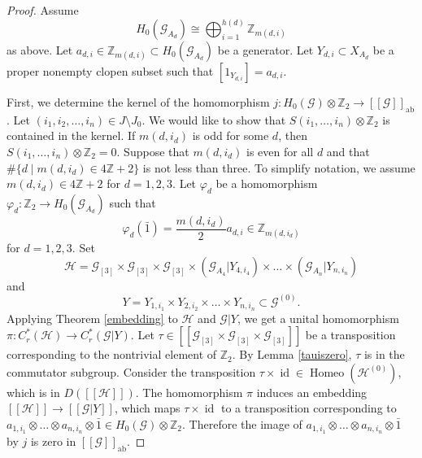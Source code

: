 \documentclass[11pt]{article}
\theoremstyle{definition}
\numberwithin{equation}{section}
\renewcommand{\phi}{\varphi}
\newcommand{\Homeo}{\operatorname{Homeo}}
\newcommand{\id}{\operatorname{id}}
\newcommand{\ab}{\mathrm{ab}}
\newcommand{\G}{\mathcal{G}}
\renewcommand{\H}{\mathcal{H}}
\newcommand{\Z}{\mathbb{Z}}
\begin{document}
\begin{proof}
Assume 
\[
H_0(\G_{A_d})\cong\bigoplus_{i=1}^{h(d)}\Z_{m(d,i)}
\]
as above. 
Let $a_{d,i}\in\Z_{m(d,i)}\subset H_0(\G_{A_d})$ be a generator. 
Let $Y_{d,i}\subset X_{A_d}$ be a proper nonempty clopen subset 
such that $[1_{Y_{d,i}}]=a_{d,i}$. 

First, we determine the kernel of 
the homomorphism $j:H_0(\G)\otimes\Z_2\to[[\G]]_\ab$. 
Let $(i_1,i_2,\dots,i_n)\in J\setminus J_0$. 
We would like to show that 
$S(i_1,\dots,i_n)\otimes\Z_2$ is contained in the kernel. 
If $m(d,i_d)$ is odd for some $d$, then $S(i_1,\dots,i_n)\otimes\Z_2=0$. 
Suppose that $m(d,i_d)$ is even for all $d$ and 
that $\#\{d\mid m(d,i_d)\in4\Z{+}2\}$ is not less than three. 
To simplify notation, we assume $m(d,i_d)\in4\Z{+}2$ for $d=1,2,3$. 
Let $\phi_d$ be a homomorphism $\phi_d:\Z_2\to H_0(\G_{A_d})$ such that 
\[
\phi_d(\bar{1})=\frac{m(d,i_d)}{2}a_{d,i}\in\Z_{m(d,i_d)}
\]
for $d=1,2,3$. 
Set 
\[
\H=\G_{[3]}\times\G_{[3]}\times\G_{[3]}
\times(\G_{A_4}|Y_{4,i_4})\times\dots\times(\G_{A_n}|Y_{n,i_n})
\]
and 
\[
Y=Y_{1,i_1}\times Y_{2,i_2}\times\dots\times Y_{n,i_n}\subset\G^{(0)}. 
\]
Applying Theorem \ref{embedding} to $\H$ and $\G|Y$, 
we get a unital homomorphism $\pi:C^*_r(\H)\to C^*_r(\G|Y)$. 
Let $\tau\in[[\G_{[3]}\times\G_{[3]}\times\G_{[3]}]]$ be a transposition 
corresponding to the nontrivial element of $\Z_2$. 
By Lemma \ref{tauiszero}, $\tau$ is in the commutator subgroup. 
Consider the transposition $\tau\times\id\in\Homeo(\H^{(0)})$, 
which is in $D([[\H]])$. 
The homomorphism $\pi$ induces an embedding $[[\H]]\to[[\G|Y]]$, 
which maps $\tau\times\id$ to a transposition corresponding to 
$a_{1,i_1}\otimes\dots\otimes a_{n,i_n}\otimes\bar{1}\in H_0(\G)\otimes\Z_2$. 
Therefore 
the image of $a_{1,i_1}\otimes\dots\otimes a_{n,i_n}\otimes\bar{1}$ by $j$ 
is zero in $[[\G]]_\ab$. 


\end{proof}
\end{document}
